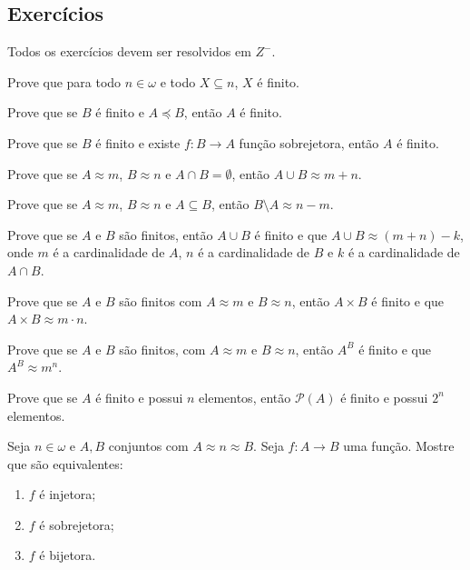 \subsection*{Exercícios}
Todos os exercícios devem ser resolvidos em $Z^-$.
\begin{exercise}
    Prove que para todo $n\in\omega$ e todo $X\subseteq n$, $X$ é finito.
\end{exercise}
\begin{exercise}
    Prove que se $B$ é finito e $A\preceq B$, então $A$ é finito.
\end{exercise}
\begin{exercise}
    Prove que se $B$ é finito e existe $f:B\to A$ função sobrejetora, então $A$ é finito.
\end{exercise}
\begin{exercise}\label{ex:aritmeticaFinitaUniao}
    Prove que se $A\approx m$, $B\approx n$ e $A\cap B=\emptyset$, então $A\cup B \approx m+n$.
\end{exercise}
\begin{exercise}
    Prove que se $A\approx m$, $B\approx n$ e $A\subseteq B$, então $B\setminus A \approx n-m$.
\end{exercise}
\begin{exercise}
    Prove que se $A$ e $B$ são finitos, então $A\cup B$ é finito e que $A\cup B\approx(m+n)-k$, onde $m$ é a cardinalidade de $A$, $n$ é a cardinalidade de $B$ e $k$ é a cardinalidade de $A\cap B$.
\end{exercise}
\begin{exercise}\label{ex:aritmeticaFinitaProduto}
    Prove que se $A$ e $B$ são finitos com $A\approx m$ e $B\approx n$, então $A\times B$ é finito e que $A\times B \approx m\cdot n$.
\end{exercise}
\begin{exercise}\label{ex:aritmeticaFinitaPotencia}
    Prove que se $A$ e $B$ são finitos, com $A\approx m$ e $B\approx n$, então $A^B$ é finito e que $A^B \approx m^n$.
\end{exercise}
\begin{exercise}
    Prove que se $A$ é finito e possui $n$ elementos, então $\mathcal P(A)$ é finito e possui $2^n$ elementos.
\end{exercise}
\begin{exercise}
    Seja $n \in \omega$ e $A, B$ conjuntos com $A\approx n\approx B$.
    Seja $f:A\to B$ uma função.
    Mostre que são equivalentes:
    \begin{enumerate}[label=(\alph*)]
        \item $f$ é injetora;
        \item $f$ é sobrejetora;
        \item $f$ é bijetora.
    \end{enumerate}
\end{exercise}

